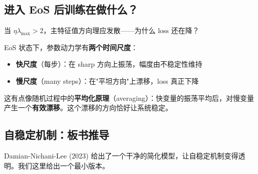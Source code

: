 \documentclass[12pt, a4paper]{ctexart}
\begin{document}
\subsection{进入 EoS 后训练在做什么？}

当 $\eta \lambda_{\max} > 2$，主特征值方向理应发散——为什么 loss 还在降？

\begin{insight}[两个时间尺度]
EoS 状态下，参数动力学有\textbf{两个时间尺度}：

\begin{itemize}
\item \textbf{快尺度}（每步）：在 sharp 方向上振荡，幅度由不稳定性维持
\item \textbf{慢尺度}（many steps）：在"平坦方向"上漂移，loss 真正下降
\end{itemize}

这有点像随机过程中的\textbf{平均化原理}（averaging）：快变量的振荡平均后，对慢变量产生一个\textbf{有效漂移}。这个漂移的方向恰好让系统稳定。
\end{insight}

\subsection{自稳定机制：板书推导}

Damian-Nichani-Lee (2023) 给出了一个干净的简化模型，让自稳定机制变得透明。我们这里给出一个最小版本。
\end{document}
